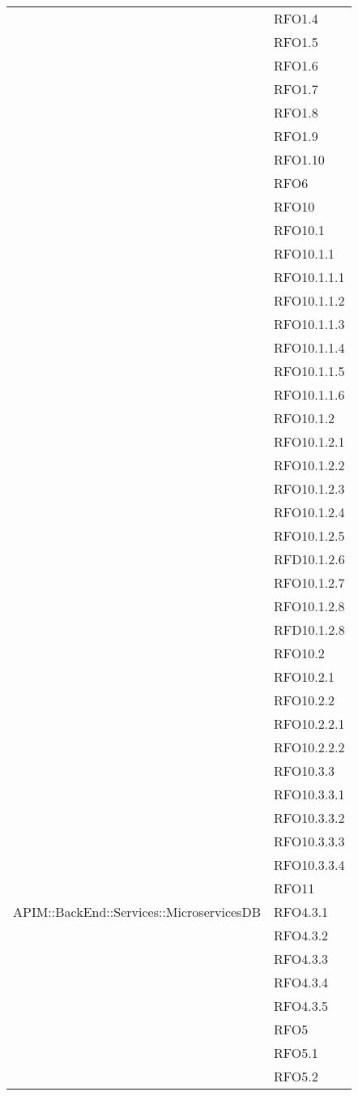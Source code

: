 \begin{longtable}{ p{12cm} | p{4cm} }
	& RFO1.4 \\
	& RFO1.5 \\
	& RFO1.6 \\
	& RFO1.7 \\
	& RFO1.8 \\
	& RFO1.9 \\
	& RFO1.10 \\
	& RFO6 \\
	& RFO10 \\
	& RFO10.1 \\
	& RFO10.1.1 \\
	& RFO10.1.1.1 \\
	& RFO10.1.1.2 \\
	& RFO10.1.1.3 \\
	& RFO10.1.1.4 \\
	& RFO10.1.1.5 \\
	& RFO10.1.1.6 \\
	& RFO10.1.2 \\
	& RFO10.1.2.1 \\
	& RFO10.1.2.2 \\
	& RFO10.1.2.3 \\
	& RFO10.1.2.4 \\
	& RFO10.1.2.5 \\
	& RFD10.1.2.6 \\
	& RFO10.1.2.7 \\
	& RFO10.1.2.8 \\
	& RFD10.1.2.8 \\
	& RFO10.2 \\
	& RFO10.2.1 \\
	& RFO10.2.2 \\
	& RFO10.2.2.1 \\
	& RFO10.2.2.2 \\
	& RFO10.3.3 \\
	& RFO10.3.3.1 \\
	& RFO10.3.3.2 \\
	& RFO10.3.3.3 \\
	& RFO10.3.3.4 \\
	& RFO11 \\
	\hline
	APIM::BackEnd::Services::MicroservicesDB
	& RFO4.3.1 \\
	& RFO4.3.2 \\
	& RFO4.3.3 \\
	& RFO4.3.4 \\
	& RFO4.3.5 \\
	& RFO5 \\
	& RFO5.1 \\
	& RFO5.2 \\

\end{longtable}
